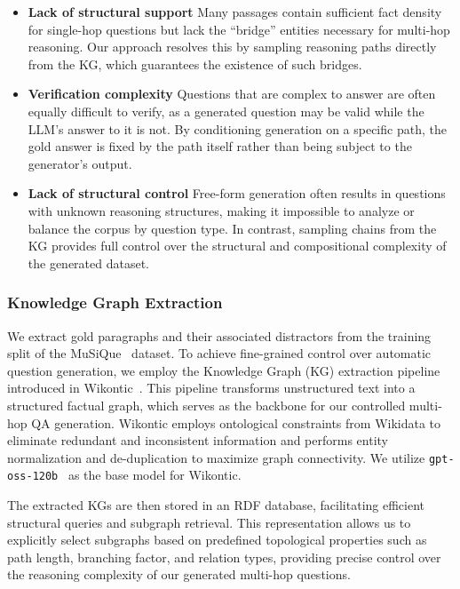 \begin{itemize}
    \item  \textbf{Lack of structural support} \hspace{0.5em} Many passages contain sufficient fact density for single-hop questions but lack the ``bridge'' entities necessary for multi-hop reasoning. Our approach resolves this by sampling reasoning paths directly from the KG, which guarantees the existence of such bridges.
    \item  \textbf{Verification complexity} \hspace{0.5em} Questions that are complex to answer are often equally difficult to verify, as a generated question may be valid while the LLM's answer to it is not. By conditioning generation on a specific path, the gold answer is fixed by the path itself rather than being subject to the generator’s output.
    \item  \textbf{Lack of structural control} \hspace{0.5em} Free-form generation often results in questions with unknown reasoning structures, making it impossible to analyze or balance the corpus by question type. In contrast, sampling chains from the KG provides full control over the structural and compositional complexity of the generated dataset.
\end{itemize}    

\subsubsection{Knowledge Graph Extraction}
We extract gold paragraphs and their associated distractors from the training split of the MuSiQue~\citep{musique} dataset. To achieve fine-grained control over automatic question generation, we employ the Knowledge Graph (KG) extraction pipeline introduced in Wikontic~\citep{chepurova-etal-2026-wikontic}. This pipeline transforms unstructured text into a structured factual graph, which serves as the backbone for our controlled multi-hop QA generation. Wikontic employs ontological constraints from Wikidata to eliminate redundant and inconsistent information and performs entity normalization and de-duplication to maximize graph connectivity.   We utilize \texttt{gpt-oss-120b}~\citep{openai2025gptoss120bgptoss20bmodel} as the base model for Wikontic.

The extracted KGs are then stored in an RDF database, facilitating efficient structural queries and subgraph retrieval. This representation allows us to explicitly select subgraphs based on predefined topological properties such as path length, branching factor, and relation types, providing precise control over the reasoning complexity of our generated multi-hop questions.

